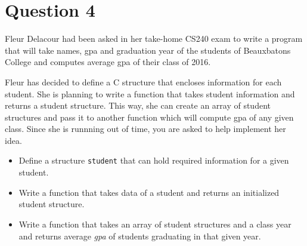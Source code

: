 
\section*{Question 4}

Fleur Delacour had been asked in her take-home CS240 exam to write a program that will take names, gpa and graduation year of the students of Beauxbatons College and computes average gpa of their class of 2016.

Fleur has decided to define a C structure that encloses information for each student.
She is planning to write a function that takes student information and returns a student structure.
This way, she can create an array of student structures and pass it to another function which will compute gpa of any given class.
Since she is runnning out of time, you are asked to help implement her idea.

\begin{itemize}
\item Define a structure \texttt{student} that can hold required information for a given student.
\item Write a function that takes data of a student and returns an initialized student structure.
\item Write a function that takes an array of student structures and a class year and returns average \textit{gpa} of students graduating in that given year.
\end{itemize}
